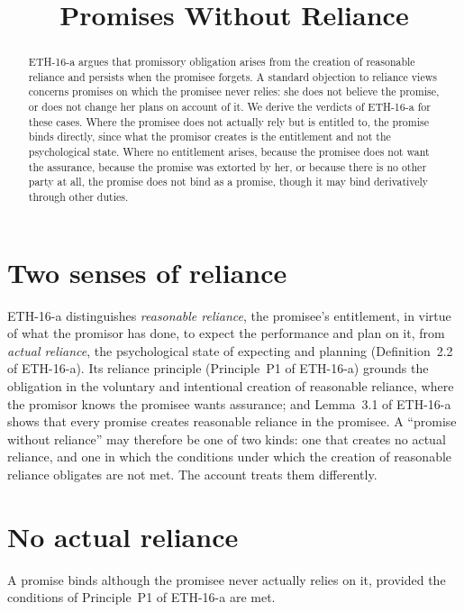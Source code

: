 \documentclass{situationist-preprint}
\title{Promises Without Reliance}
\begin{document}
\maketitle

\begin{abstract}
ETH-16-a argues that promissory obligation arises from the creation of reasonable reliance and persists when the promisee forgets. A standard objection to reliance views concerns promises on which the promisee never relies: she does not believe the promise, or does not change her plans on account of it. We derive the verdicts of ETH-16-a for these cases. Where the promisee does not actually rely but is entitled to, the promise binds directly, since what the promisor creates is the entitlement and not the psychological state. Where no entitlement arises, because the promisee does not want the assurance, because the promise was extorted by her, or because there is no other party at all, the promise does not bind as a promise, though it may bind derivatively through other duties.
\end{abstract}

\section{Two senses of reliance}

ETH-16-a distinguishes \emph{reasonable reliance}, the promisee's entitlement, in virtue of what the promisor has done, to expect the performance and plan on it, from \emph{actual reliance}, the psychological state of expecting and planning (Definition~2.2 of ETH-16-a). Its reliance principle (Principle~P1 of ETH-16-a) grounds the obligation in the voluntary and intentional creation of reasonable reliance, where the promisor knows the promisee wants assurance; and Lemma~3.1 of ETH-16-a shows that every promise creates reasonable reliance in the promisee. A \enquote{promise without reliance} may therefore be one of two kinds: one that creates no actual reliance, and one in which the conditions under which the creation of reasonable reliance obligates are not met. The account treats them differently.

\section{No actual reliance}

\begin{proposition}\label{p:noactual}
A promise binds although the promisee never actually relies on it, provided the conditions of Principle~P1 of ETH-16-a are met.
\end{proposition}
\end{document}
